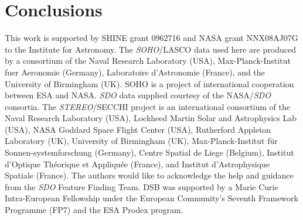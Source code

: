 \documentclass[preprint2]{aastex}
\begin{document}
\section{Conclusions}




\begin{acknowledgements}
This work is supported by SHINE grant 0962716 and NASA grant NNX08AJ07G to the Institute for Astronomy. The \emph{SOHO}/LASCO data used here are produced by a consortium of the Naval Research Laboratory (USA), Max-Planck-Institut fuer Aeronomie (Germany), Laboratoire d'Astronomie (France), and the University of Birmingham (UK). SOHO is a project of international cooperation between ESA and NASA. \emph{SDO} data supplied courtesy of the NASA/\emph{SDO} consortia. The \emph{STEREO}/SECCHI project is an international consortium of the Naval Research Laboratory (USA), Lockheed Martin Solar and Astrophysics Lab (USA), NASA Goddard Space Flight Center (USA), Rutherford Appleton Laboratory (UK), University of Birmingham (UK), Max-Planck-Institut f\"{u}r Sonnen-systemforschung (Germany), Centre Spatial de Liege (Belgium), Institut d'Optique Th\'{e}orique et Appliqu\'{e}e (France), and Institut d'Astrophysique Spatiale (France). The authors would like to acknowledge the help and guidance from the \emph{SDO} Feature Finding Team. DSB was supported by a Marie Curie Intra-European Fellowship under the European Community's Seventh Framework Programme (FP7) and the ESA Prodex program. 
\end{acknowledgements}


\end{document}
